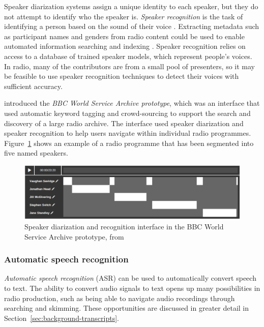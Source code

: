 Speaker diarization systems assign a unique identity to each speaker, but they do not attempt to identify who the
speaker is. \textit{Speaker recognition} is the task of identifying a person based on the sound of their voice
\citep{Doddington1985,Lee1999a}. Extracting metadata such as participant names and genders from radio content could be
used to enable automated information searching and indexing \citep{Kinnunen2010}. Speaker recognition relies on access
to a database of trained speaker models, which represent people's voices. In radio, many of the contributors are from a
small pool of presenters, so it may be feasible to use speaker recognition techniques to detect their voices with
sufficient accuracy.

\citet{Raimond2014} introduced the \textit{BBC World Service Archive prototype}, which was an interface that used
automatic keyword tagging and crowd-sourcing to support the search and discovery of a large radio archive.
The interface used speaker diarization and speaker recognition to help users navigate within individual radio
programmes. Figure~\ref{fig:bg-world-service-archive} shows an example of a radio programme that has been segmented
into five named speakers.

\begin{figure}[h]
  \centering
  \includegraphics[width=\textwidth]{figs/world-service-archive.jpg}
  \caption{Speaker diarization and recognition interface in the BBC World Service Archive prototype, from
  \citet{Raimond2014}}
  \label{fig:bg-world-service-archive}
\end{figure}



\subsubsection{Automatic speech recognition}\label{sec:asr}

\textit{Automatic speech recognition} (ASR) can be used to automatically convert speech to text.  The ability to
convert audio signals to text opens up many possibilities in radio production, such as being able to navigate audio
recordings through searching and skimming.  These opportunities are discussed in greater detail in
Section~\ref{sec:background-transcripts}.

